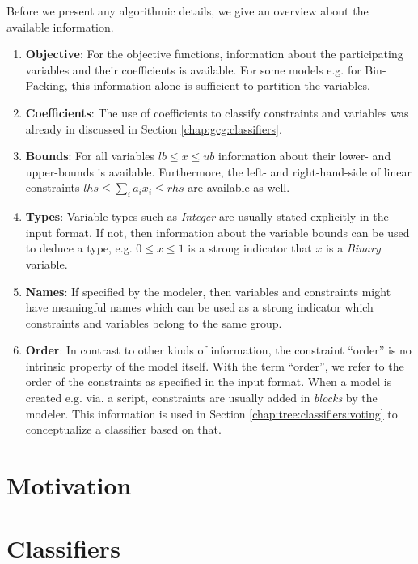 	Before we present any algorithmic details, we give an overview about the available information.
	
	\begin{enumerate}
		\item \textbf{Objective}: For the objective functions, information about the participating variables and their coefficients is available. For some models e.g. for Bin-Packing, this information alone is sufficient to partition the variables.
		\item \textbf{Coefficients}:
		The use of coefficients to classify constraints and variables was already in discussed in Section \ref{chap:gcg:classifiers}.
		\item \textbf{Bounds}: For all variables $lb \leq x \leq ub$ information about their lower- and upper-bounds is available.
		Furthermore, the left- and right-hand-side of linear constraints $lhs \leq \sum_i a_i x_i \leq rhs$ are available as well.
		\item \textbf{Types}: Variable types such as \textit{Integer} are usually stated explicitly in the input format. If not, then information about the variable bounds can be used to deduce a type, e.g. $0 \leq x \leq 1$ is a strong indicator that $x$ is a \textit{Binary} variable.
		\item \textbf{Names}: If specified by the modeler, then variables and constraints might have meaningful names which can be used as a strong indicator which constraints and variables belong to the same group.
		\item \textbf{Order}: In contrast to other kinds of information, the constraint \enquote{order} is no intrinsic property of the model itself. With the term \enquote{order}, we refer to the order of the constraints as specified in the input format. When a model is created e.g. via. a script, constraints are usually added in \textit{blocks} by the modeler. This information is used in Section \ref{chap:tree:classifiers:voting} to conceptualize a classifier based on that.
	\end{enumerate}
	
	\section{Motivation}
	
	\section{Classifiers}
	
